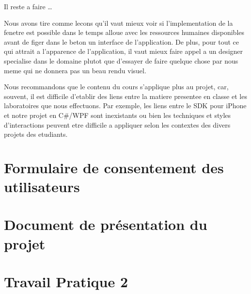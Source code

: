 \documentclass[letterpaper, oneside, 12pt, these, creativecommons]{thETS}
\begin{document}
Il reste a faire \dots

Nous avons tire comme lecons qu'il vaut mieux voir si l'implementation de la fenetre est possible dans le temps alloue avec les ressources humaines disponibles avant de figer dans le beton un interface de l'application. De plus, pour tout ce qui attrait a l'apparence de l'application, il vaut mieux faire appel a un designer specialise dans le domaine plutot que d'essayer de faire quelque chose par nous meme qui ne donnera pas un beau rendu visuel.

Nous recommandons que le contenu du cours s'applique plus au projet, car, souvent, il est difficile d'etablir des liens entre la matiere presentee en classe et les laboratoires que nous effectuons. Par exemple, les liens entre le SDK pour iPhone et notre projet en C\#/WPF sont inexistants ou bien les techniques et styles d'interactions peuvent etre difficile a appliquer selon les contextes des divers projets des etudiants.

\appendix
\multiannexe

\chapter{Formulaire de consentement des utilisateurs}



\chapter{Document de présentation du projet}



\chapter{Travail Pratique 2}


\end{document}
